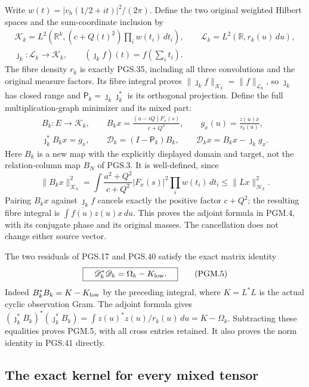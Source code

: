 Write \(w(t)=|v_h(1/2+it)|^2/(2\pi)\). Define the two original
weighted Hilbert spaces and the sum-coordinate inclusion by
\[
\begin{gathered}
 \mathscr K_k=L^2\left(\mathbb{R}^k,
                   (c+Q(t)^2)\prod_i w(t_i)\,dt_i\right),\qquad
 \mathscr L_k=L^2(\mathbb{R},r_k(u)\,du),\\
 \jmath_k:\mathscr L_k\longrightarrow\mathscr K_k,\qquad
          (\jmath_k f)(t)=f\left(\sum_i t_i\right).
\end{gathered}
\tag{PGM.3}\label{eq:pgm-hilbert}
\]
The fibre density \(r_k\) is exactly PGS.35, including all three
convolutions and the original measure factors. Its fibre integral
proves \(\|\jmath_k f\|_{\mathscr K_k}=\|f\|_{\mathscr L_k}\),
so \(\jmath_k\) has closed range and
\(\mathsf P_k=\jmath_k\jmath_k^*\) is its orthogonal projection.
Define the full multiplication-graph minimizer and its mixed part:
\[
\begin{gathered}
 B_k:E\longrightarrow\mathscr K_k,\qquad
 B_kx=\frac{(a-iQ)F_x(s)}{c+Q^2},\qquad
 g_x(u)=\frac{z(u)x}{r_k(u)},\\
 \jmath_k^*B_kx=g_x,\qquad
 \mathscr D_k=(I-\mathsf P_k)B_k,\qquad
 \mathscr D_kx=B_kx-\jmath_k g_x .
\end{gathered}
\tag{PGM.4}\label{eq:pgm-map}
\]
Here \(B_k\) is a new map with the explicitly displayed domain and
target, not the relation-column map \(B_N\) of PGS.3. It is
well-defined, since
\[
 \|B_kx\|_{\mathscr K_k}^2
 =\int\frac{a^2+Q^2}{c+Q^2}|F_x(s)|^2\prod_iw(t_i)\,dt_i
 \leq\|Lx\|_{\mathscr H_k}^2.
\]
Pairing \(B_kx\) against \(\jmath_k f\) cancels exactly the
positive factor \(c+Q^2\); the resulting fibre integral is
\(\int\overline{f(u)}z(u)x\,du\). This proves the adjoint
formula in PGM.4, with its conjugate phase and its original masses.
The cancellation does not change either source vector.

The two residuals of PGS.17 and PGS.40 satisfy the exact matrix
identity
\[
 \boxed{\quad \mathscr D_k^*\mathscr D_k
                       =\Omega_k-K_{\rm low}.\quad}
 \tag{PGM.5}\label{eq:pgm-gram}
\]
Indeed \(B_k^*B_k=K-K_{\rm low}\) by the preceding integral,
where \(K=L^*L\) is the actual cyclic observation Gram.
The adjoint formula gives
\((\jmath_k^*B_k)^*(\jmath_k^*B_k)=
\int z(u)^*z(u)/r_k(u)\,du=K-\Omega_k\).
Subtracting these equalities proves PGM.5, with all cross entries
retained. It also proves the norm identity in PGS.41 directly.

\subsection{The exact kernel for every mixed tensor}

